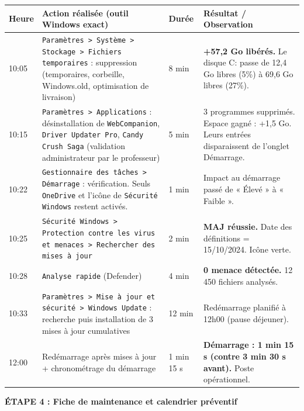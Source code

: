 \documentclass[11pt]{article}
\begin{document}
\begin{exoresolu}
\begin{center}
\begin{tabularx}{\linewidth}{|l|X|l|X|}
\hline
\rowcolor{popgreenL}
\textbf{Heure} & \textbf{Action réalisée (outil Windows exact)} & \textbf{Durée} & \textbf{Résultat / Observation} \\
\hline
10:05 & \texttt{Paramètres > Système > Stockage > Fichiers temporaires} : suppression (temporaires, corbeille, Windows.old, optimisation de livraison) & 8 min & \textbf{+57,2 Go libérés.} Le disque C: passe de 12,4 Go libres (5\%) à 69,6 Go libres (27\%). \\
\hline
10:15 & \texttt{Paramètres > Applications} : désinstallation de \texttt{WebCompanion}, \texttt{Driver Updater Pro}, \texttt{Candy Crush Saga} (validation administrateur par le professeur) & 5 min & 3 programmes supprimés. Espace gagné : +1,5 Go. Leurs entrées disparaissent de l'onglet Démarrage. \\
\hline
10:22 & \texttt{Gestionnaire des tâches > Démarrage} : vérification. Seuls \texttt{OneDrive} et l'icône de \texttt{Sécurité Windows} restent activés. & 1 min & Impact au démarrage passé de « Élevé » à « Faible ». \\
\hline
10:25 & \texttt{Sécurité Windows > Protection contre les virus et menaces > Rechercher des mises à jour} & 2 min & \textbf{MAJ réussie.} Date des définitions = 15/10/2024. Icône verte. \\
\hline
10:28 & \texttt{Analyse rapide} (Defender) & 4 min & \textbf{0 menace détectée.} 12 450 fichiers analysés. \\
\hline
10:33 & \texttt{Paramètres > Mise à jour et sécurité > Windows Update} : recherche puis installation de 3 mises à jour cumulatives & 12 min & Redémarrage planifié à 12h00 (pause déjeuner). \\
\hline
12:00 & Redémarrage après mises à jour + chronométrage du démarrage & 1 min 15 s & \textbf{Démarrage : 1 min 15 s (contre 3 min 30 s avant).} Poste opérationnel. \\
\hline
\end{tabularx}
\end{center}

\textbf{ÉTAPE 4 : Fiche de maintenance et calendrier préventif}


\end{exoresolu}
\end{document}
